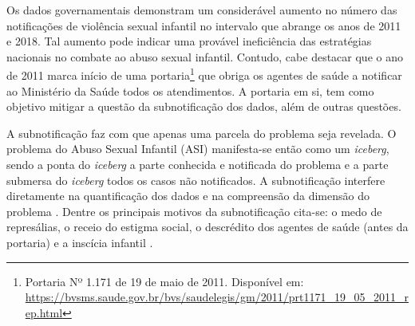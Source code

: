 
Os dados governamentais demonstram um considerável aumento no número das notificações de violência sexual infantil no intervalo que abrange os anos de 2011 e 2018. Tal aumento pode indicar uma provável ineficiência das estratégias nacionais no combate ao abuso sexual infantil. Contudo, cabe destacar que o ano de 2011 marca início de uma portaria\footnote{\label{note:nota0} Portaria Nº 1.171 de 19 de maio de 2011. Disponível em: \url{https://bvsms.saude.gov.br/bvs/saudelegis/gm/2011/prt1171_19_05_2011_rep.html}} que obriga os agentes de saúde a notificar ao Ministério da Saúde todos os atendimentos. A portaria em si, tem como objetivo mitigar a questão da subnotificação dos dados, além de outras questões.




A subnotificação faz com que apenas uma parcela do problema seja revelada. O problema do Abuso Sexual Infantil (ASI) manifesta-se então como um \textit{iceberg}, sendo a ponta do \textit{iceberg} a parte conhecida e notificada do problema e a parte submersa do \textit{iceberg} todos os casos não notificados. A subnotificação interfere diretamente na quantificação dos dados e na compreensão da dimensão do problema \cite{deslandes2016atendimento, da2017violencia}. Dentre os principais motivos da subnotificação cita-se: o medo de represálias, o receio do estigma social, o descrédito dos agentes de saúde (antes da portaria) e a inscícia infantil \cite{publica2019sao, pavao2013impasse}.


